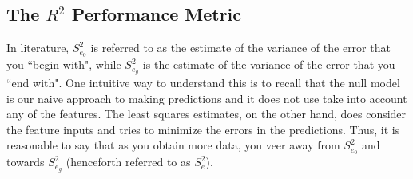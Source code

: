 \documentclass[12pt, a4paper]{article}
\theoremstyle{definition}
\begin{document}
	\subsection*{The $R^2$ Performance Metric}
		
	In literature, $S_{e_0}^2$ is referred to as the estimate of the variance of the error
	that you ``begin with", while  $S_{e_g}^2$ is the estimate of the variance of the error
	that you ``end with". One intuitive way to understand this is to recall that the null
	model is our naive approach to making predictions and it does not use take into account
	any of the features. The least squares estimates, on the other hand, does consider
	the feature inputs and tries to minimize the errors in the predictions. Thus, it is
	reasonable to say that as you obtain more data, you veer away from $S_{e_0}^2$
	and towards $S_{e_g}^2$ (henceforth referred to as $S_{e}^2$).
	
\end{document}
